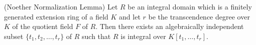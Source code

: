 (Noether Normalization Lemma) Let $R$ be an integral domain which is a finitely generated extension ring of a field $K$ and let $r$ be the transcendence degree over $K$ of the quotient field $F$ of $R$. Then there exists an algebraically independent subset $\{t_1, t_2, \ldots, t_r\}$ of $R$ such that $R$ is integral over $K[t_1, \ldots, t_r]$.
